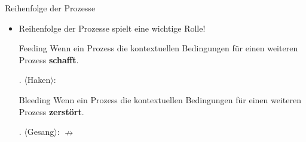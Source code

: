 \begin{frame}{Reihenfolge der Prozesse}

\begin{itemize}
	\item Reihenfolge der Prozesse spielt eine wichtige Rolle!

	\begin{block}{Feeding}
	Wenn ein Prozess die kontextuellen Bedingungen für einen weiteren Prozess \textbf{schafft}.	

	\end{block}

	\ex. $\langle$Haken$\rangle$:  \ras \textipa{[ha:k\textsyllabic{n}]} \ras \textipa{[ha:k\textsyllabic{N}]}

	\begin{block}{Bleeding}
	Wenn ein Prozess die kontextuellen Bedingungen für einen weiteren Prozess \textbf{zerstört}.
	\end{block}

	\ex. $\langle$Gesang$\rangle$:  \ras \textipa{[g@.zaNg]} \ras \textipa{[g@.zaN]} $\nrightarrow$ \textipa{[g@.zaNk]}
	
\end{itemize}

\end{frame}